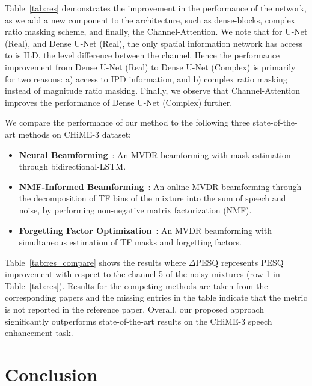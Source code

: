 \documentclass{article}
\begin{document}
Table~\ref{tab:res} demonstrates the improvement in the performance of the network, as we add a new component to the architecture, such as dense-blocks, complex ratio masking scheme, and finally, the Channel-Attention. We note that for U-Net (Real), and Dense U-Net (Real), the only spatial information network has access to is ILD, the level difference between the channel. Hence the performance improvement from Dense U-Net (Real) to Dense U-Net (Complex) is primarily for two reasons: a) access to IPD information, and b) complex ratio masking instead of magnitude ratio masking. Finally, we observe that Channel-Attention improves the performance of Dense U-Net (Complex) further.












We compare the performance of our method to the following three state-of-the-art methods on CHiME-3 dataset:

\begin{itemize}
\item \textbf{Neural Beamforming}~\cite{erdogan}: An MVDR beamforming with mask estimation through bidirectional-LSTM.
\item \textbf{NMF-Informed Beamforming}~\cite{nmfb}: An online MVDR beamforming through the decomposition of TF bins of the mixture into the sum of speech and noise, by performing non-negative matrix factorization (NMF).
\item \textbf{Forgetting Factor Optimization}~\cite{forget}: An MVDR beamforming with simultaneous estimation of TF masks and forgetting factors.
\end{itemize}



Table~\ref{tab:res_compare} shows the results where $\Delta$PESQ represents PESQ improvement with respect to the channel 5 of the noisy mixtures (row 1 in Table~\ref{tab:res}). Results for the competing methods are taken from the corresponding papers and the missing entries in the table indicate that the metric is not reported in the reference paper. Overall, our proposed approach significantly outperforms state-of-the-art results on the CHiME-3 speech enhancement task.

\vspace{-2mm}
\section{Conclusion}
\label{sec:con}
\end{document}
